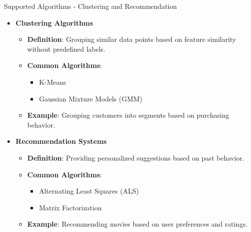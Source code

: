 \documentclass[aspectratio=169]{beamer}
\begin{document}
\begin{frame}[fragile]{Supported Algorithms - Clustering and Recommendation}
  \begin{itemize}
    \item \textbf{Clustering Algorithms}
      \begin{itemize}
        \item \textbf{Definition}: Grouping similar data points based on feature similarity without predefined labels.
        \item \textbf{Common Algorithms}:
          \begin{itemize}
            \item K-Means
            \item Gaussian Mixture Models (GMM)
          \end{itemize}
        \item \textbf{Example}: Grouping customers into segments based on purchasing behavior.
      \end{itemize}
    
    \item \textbf{Recommendation Systems}
      \begin{itemize}
        \item \textbf{Definition}: Providing personalized suggestions based on past behavior.
        \item \textbf{Common Algorithms}:
          \begin{itemize}
            \item Alternating Least Squares (ALS)
            \item Matrix Factorization
          \end{itemize}
        \item \textbf{Example}: Recommending movies based on user preferences and ratings.
      \end{itemize}
  \end{itemize}
\end{frame}
\end{document}

